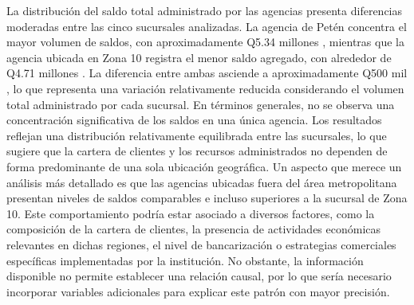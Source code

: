 La distribución del saldo total administrado por las agencias presenta diferencias moderadas entre las cinco sucursales analizadas. La agencia de
Petén
concentra el mayor volumen de saldos, con aproximadamente
Q5.34 millones
, mientras que la agencia ubicada en
Zona 10
registra el menor saldo agregado, con alrededor de
Q4.71 millones
. La diferencia entre ambas asciende a aproximadamente
Q500 mil
, lo que representa una variación relativamente reducida considerando el volumen total administrado por cada sucursal.
En términos generales, no se observa una concentración significativa de los saldos en una única agencia. Los resultados reflejan una distribución relativamente equilibrada entre las sucursales, lo que sugiere que la cartera de clientes y los recursos administrados no dependen de forma predominante de una sola ubicación geográfica.
Un aspecto que merece un análisis más detallado es que las agencias ubicadas fuera del área metropolitana presentan niveles de saldos comparables e incluso superiores a la sucursal de Zona 10. Este comportamiento podría estar asociado a diversos factores, como la composición de la cartera de clientes, la presencia de actividades económicas relevantes en dichas regiones, el nivel de bancarización o estrategias comerciales específicas implementadas por la institución. No obstante, la información disponible no permite establecer una relación causal, por lo que sería necesario incorporar variables adicionales para explicar este patrón con mayor precisión.